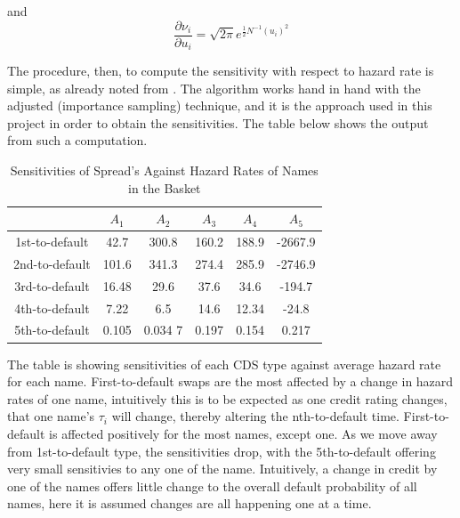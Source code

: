 \documentclass[a4paper,12pt]{article}
\begin{document}
 and 
$$\frac{\partial \nu_i}{\partial u_i} = \sqrt{2\pi}e^{\frac{1}{2}N^{-1}(u_i)^2}$$

The procedure, then, to compute the sensitivity with respect to hazard rate is simple, as already noted from \cite{joshi_kainth}. The algorithm works hand in hand with the adjusted (importance sampling) technique, and it is the approach used in this project in order to obtain the sensitivities. The table below shows the output from such a computation. 

\begin{table}[h!]
\begin{center}
\begin{tabular}{ |c|c|c|c|c|c| }

\hline
 &$ A_1 $ & $ A_2 $ & $ A_3 $ & $ A_4 $ & $ A_5 $\\
\hline
1st-to-default & 42.7 & 300.8 & 160.2 & 188.9 & -2667.9 \\ 
\hline
2nd-to-default & 101.6 & 341.3 & 274.4 & 285.9 & -2746.9 \\
\hline
3rd-to-default  & 16.48 & 29.6 & 37.6 & 34.6 & -194.7 \\
\hline
4th-to-default  & 7.22 & 6.5 & 14.6 & 12.34 & -24.8 \\
\hline
5th-to-default  & 0.105 & 0.034 7 & 0.197 & 0.154 & 0.217 \\
\hline

\end{tabular}
\caption{Sensitivities of Spread's Against Hazard Rates of Names in the Basket}
\end{center}
\end{table}

The table is showing sensitivities of each CDS type against average hazard rate for each name. First-to-default swaps are the most affected by a change in hazard rates of one name, intuitively this is to be expected as one credit rating changes, that one name's $\tau_i$ will change, thereby altering the nth-to-default time. First-to-default is affected positively for the most names, except one. As we move away from 1st-to-default type, the sensitivities drop, with the 5th-to-default offering very small sensitivies to any one of the name. Intuitively, a change in credit by one of the names offers little change to the overall default probability of all names, here it is assumed changes are all happening one at a time.
\end{document}
